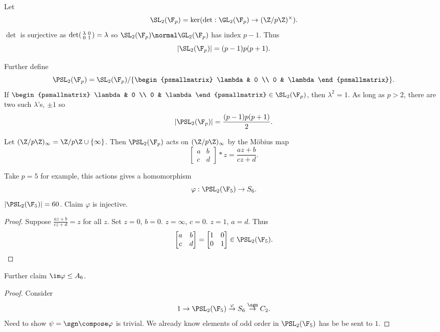 \documentclass[a4paper]{article}
\theoremstyle{definition}
\begin{document}
\begin{eg}
  Let
  \[
    \SL_2(\F_p) = \ker (\det: \GL_2(\F_p) \to (\Z/p\Z)^\times).
  \]
  \(\det\) is surjective as \(\det \begin{psmallmatrix} \lambda & 0 \\ 0 & 1 \end{psmallmatrix} = \lambda\) so \(\SL_2(\F_p) \normal \GL_2(\F_p)\) has index \(p - 1\). Thus
  \[
    |\SL_2(\F_p)| = (p - 1)p(p + 1).
  \]

  Further define
  \[
    \PSL_2(\F_p) = \SL_2(\F_p)/
    \{
    \begin{psmallmatrix}
      \lambda & 0 \\
      0 & \lambda
    \end{psmallmatrix}
    \}.
  \]
  If \(\begin{psmallmatrix} \lambda & 0 \\ 0 & \lambda \end{psmallmatrix} \in \SL_2(\F_p)\), then \(\lambda^2 = 1\). As long as \(p > 2\), there are two such \(\lambda\)'s, \(\pm 1\) so
  \[
    |\PSL_2(\F_p)| = \frac{(p - 1)p(p + 1)}{2}.
  \]

  Let \((\Z/p\Z)_\infty = \Z/p\Z \cup \{\infty\}\). Then \(\PSL_2(\F_p)\) acts on \((\Z/p\Z)_\infty\) by the Möbius map
  \[
    \begin{bmatrix}
      a & b \\
      c & d
    \end{bmatrix}
    * z = \frac{az + b}{cz + d}.
  \]

  Take \(p = 5\) for example, this actions gives a homomorphism
  \[
    \varphi: \PSL_2(\F_5) \to S_6.
  \]
  \(|\PSL_2(\F_5)| = 60\). Claim \(\varphi\) is injective.

  \begin{proof}
    Suppose \(\frac{az + b}{cz + d} = z\) for all \(z\). Set \(z = 0\), \(b = 0\). \(z = \infty\), \(c = 0\). \(z = 1\), \(a = d\). Thus
    \[
      \begin{bmatrix}
        a & b \\
        c & d
      \end{bmatrix}
      =
      \begin{bmatrix}
        1 & 0 \\
        0 & 1
      \end{bmatrix}
      \in \PSL_2(\F_5).
    \]
  \end{proof}

  Further claim \(\im \varphi \leq A_6\).

  \begin{proof}
    Consider
    \[
      1 \to \PSL_2(\F_5) \stackrel{\varphi}{\to} S_6 \stackrel{\sgn}{\to} C_2.
    \]
    Need to show \(\psi = \sgn \compose \varphi\) is trivial. We already know elements of odd order in \(\PSL_2(\F_5)\) has be be sent to \(1\).


\end{proof}
\end{eg}
\end{document}
